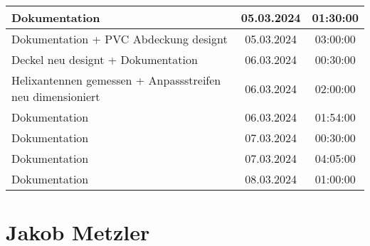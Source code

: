 \begin{longtable}{|l|c|c|}
	\hline
	Dokumentation & 05.03.2024 & 01:30:00 \\
	\hline
	Dokumentation + PVC Abdeckung designt & 05.03.2024 & 03:00:00 \\
	\hline
	Deckel neu designt + Dokumentation & 06.03.2024 & 00:30:00 \\
	\hline
	Helixantennen gemessen + Anpassstreifen neu dimensioniert & 06.03.2024 & 02:00:00 \\
	\hline
	Dokumentation & 06.03.2024 & 01:54:00 \\
	\hline
	Dokumentation & 07.03.2024 & 00:30:00 \\
	\hline
	Dokumentation & 07.03.2024 & 04:05:00 \\
	\hline
	Dokumentation & 08.03.2024 & 01:00:00 \\
	\hline
\end{longtable}

\section{Jakob Metzler}

